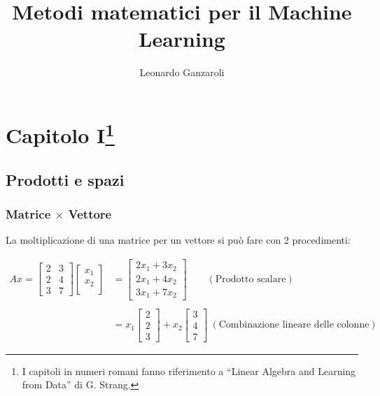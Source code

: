 \documentclass{article}
\title{Metodi matematici per il Machine Learning}
\author{Leonardo Ganzaroli}
\date{}
\begin{document}
\maketitle

\tableofcontents

\newpage

\hypersetup{allcolors=black}

\section{Capitolo I\footnote{I capitoli in numeri romani fanno riferimento a ``Linear Algebra and Learning from Data'' di G. Strang.}}

\subsection{Prodotti e spazi}

\subsubsection{\texorpdfstring{Matrice $\times$ Vettore}{Matrice x Vettore}}

La moltiplicazione di una matrice per un vettore si può fare con 2 procedimenti:

\begin{align*}
Ax=
\begin{bmatrix}
    2 & 3 \\ 
    2 & 4 \\
    3 & 7
\end{bmatrix}
\begin{bmatrix}
    x_1 \\ 
    x_2  \\
\end{bmatrix}
&=
\begin{bmatrix}
    2x_1 + 3x_2 \\ 
    2x_1 + 4x_2 \\
    3x_1 + 7x_2
\end{bmatrix}
\qquad(\text{Prodotto scalare})
\\
\\
&=
x_1
\begin{bmatrix}
    2  \\ 
    2  \\
    3 
\end{bmatrix}
+x_2
\begin{bmatrix}
    3 \\ 
    4 \\
    7
\end{bmatrix}
\ (\text{Combinazione lineare delle colonne})
\end{align*}
\end{document}
